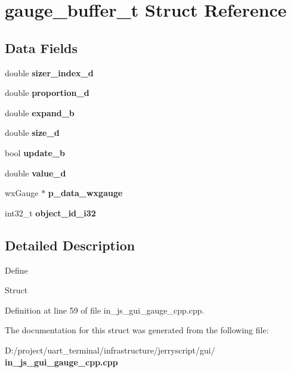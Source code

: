\section{gauge\+\_\+buffer\+\_\+t Struct Reference}
\label{structgauge__buffer__t}
\subsection*{Data Fields}
\begin{DoxyCompactItemize}
\item 
\mbox{\label{structgauge__buffer__t_aae99f717aadbf88f890c71a293468af8}} 
double {\bfseries sizer\+\_\+index\+\_\+d}
\item 
\mbox{\label{structgauge__buffer__t_a93e3ac3895fbb25863fb66af78e0ed39}} 
double {\bfseries proportion\+\_\+d}
\item 
\mbox{\label{structgauge__buffer__t_a40506be5f1249944fed816e11465f5ca}} 
double {\bfseries expand\+\_\+b}
\item 
\mbox{\label{structgauge__buffer__t_a9e85cb0e3e93fb296755e54fa5f9fc10}} 
double {\bfseries size\+\_\+d}
\item 
\mbox{\label{structgauge__buffer__t_a4aed9ad79f44786d35de6f7804904494}} 
bool {\bfseries update\+\_\+b}
\item 
\mbox{\label{structgauge__buffer__t_a5a05b112887b06e0421e4950b7e0e2fe}} 
double {\bfseries value\+\_\+d}
\item 
\mbox{\label{structgauge__buffer__t_aa5c718c15f0a55ce345087b299daccc7}} 
wx\+Gauge $\ast$ {\bfseries p\+\_\+data\+\_\+wxgauge}
\item 
\mbox{\label{structgauge__buffer__t_aa7683407966206b7eb17d410ee75d880}} 
int32\+\_\+t {\bfseries object\+\_\+id\+\_\+i32}
\end{DoxyCompactItemize}


\subsection{Detailed Description}
Define

Struct 

Definition at line 59 of file in\+\_\+js\+\_\+gui\+\_\+gauge\+\_\+cpp.\+cpp.



The documentation for this struct was generated from the following file\+:\begin{DoxyCompactItemize}
\item 
D\+:/project/uart\+\_\+terminal/infrastructure/jerryscript/gui/\textbf{ in\+\_\+js\+\_\+gui\+\_\+gauge\+\_\+cpp.\+cpp}\end{DoxyCompactItemize}
